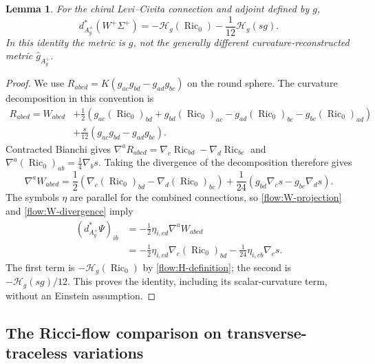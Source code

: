\documentclass[11pt]{article}
\numberwithin{equation}{section}
\newtheorem{lemma}[theorem]{Lemma}
\theoremstyle{definition}
\theoremstyle{remark}
\DeclareMathOperator{\Ric}{Ric}
\begin{document}
\begin{lemma}
\label{flow:bianchi-lemma}
For the chiral Levi--Civita connection and adjoint defined by $g$,
\begin{equation}
 \boxed{
 d_{A_g^+}^*(W^+\Sigma^+)
    =-\mathcal H_g(\Ric_0)
      -\frac1{12}\mathcal H_g(sg).
 }
 \label{flow:full-bianchi-identity}
\end{equation}
In this identity the metric is $g$, not the generally different
curvature-reconstructed metric $\widehat g_{A_g^+}$.
\end{lemma}

\begin{proof}
We use $R_{abcd}=K(g_{ac}g_{bd}-g_{ad}g_{bc})$ on the round sphere.
The curvature decomposition in this convention is
\begin{align}
 R_{abcd}=W_{abcd}
  &+\frac12(g_{ac}(\Ric_0)_{bd}+g_{bd}(\Ric_0)_{ac}
              -g_{ad}(\Ric_0)_{bc}-g_{bc}(\Ric_0)_{ad})\nonumber\\
  &+\frac{s}{12}(g_{ac}g_{bd}-g_{ad}g_{bc}).
\end{align}
Contracted Bianchi gives
$\nabla^aR_{abcd}=\nabla_c\operatorname{Ric}_{bd}
                    -\nabla_d\operatorname{Ric}_{bc}$ and
$\nabla^a(\Ric_0)_{ab}=\frac14\nabla_bs$.
Taking the divergence of the decomposition therefore gives
\begin{equation}
 \nabla^aW_{abcd}
 =\frac12(\nabla_c(\Ric_0)_{bd}-\nabla_d(\Ric_0)_{bc})
    +\frac1{24}(g_{bd}\nabla_cs-g_{bc}\nabla_ds).
 \label{flow:W-divergence}
\end{equation}
The symbols $\eta$ are parallel for the combined connections, so
\eqref{flow:W-projection} and \eqref{flow:W-divergence} imply
\begin{align}
 (d_{A_g^+}^*\Psi)_{ib}
 &=-\frac12\eta_{i,cd}\nabla^aW_{abcd}\nonumber\\
 &=-\frac12\eta_{i,cd}\nabla_c(\Ric_0)_{bd}
       -\frac1{24}\eta_{i,cb}\nabla_cs.
\end{align}
The first term is $-\mathcal H_g(\Ric_0)$ by
\eqref{flow:H-definition}; the second is
$-\mathcal H_g(sg)/12$.  This proves the identity, including its
scalar-curvature term, without an Einstein assumption.
\end{proof}

\subsection{The Ricci-flow comparison on transverse-traceless variations}
\label{sec:ricci-comparison}
\end{document}

